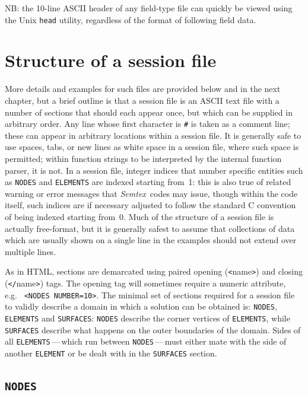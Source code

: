 \documentclass[11pt]{report}
\newcommand{\Semtex}{\emph{Semtex}} \newcommand{\Dog}{\emph{Dog}}
\newcommand{\eg}{e.g.\ } \newcommand{\CC}{\mathrm{c.c.}}
\begin{document}
NB: the 10-line ASCII header of any field-type file can quickly be viewed
using the Unix \verb|head| utility, regardless of the format of
following field data.

\section{Structure of a session file}
\label{sec.session}

More details and examples for such files are provided below and in the
next chapter, but a brief outline is that a session file is an ASCII
text file with a number of sections that should each appear once, but
which can be supplied in arbitrary order.  Any line whose first
character is \verb+#+ is taken as a comment line; these can appear in
arbitrary locations within a session file.  It is generally safe to
use spaces, tabs, or new lines as white space in a session file, where
such space is permitted; within function strings to be interpreted by
the internal function parser, it is not.  In a session file, integer
indices that number specific entities such as \verb|NODES| and
\verb|ELEMENTS| are indexed starting from~1: this is also true of
related warning or error messages that \Semtex\ codes may issue,
though within the code itself, such indices are if necessary adjusted
to follow the standard C convention of being indexed starting from~0.
Much of the structure of a session file is actually free-format, but
it is generally safest to assume that collections of data which are
usually shown on a single line in the examples should not extend over
multiple lines.

As in HTML, sections are demarcated using paired opening
(\verb+<+name\verb+>+) and closing (\verb+</+name\verb+>+) tags.  The
opening tag will sometimes require a numeric attribute, \eg
\verb+<NODES NUMBER=10>+.  The minimal set of sections required for a
session file to validly describe a domain in which a solution can be
obtained is: \verb+NODES+, \verb+ELEMENTS+ and \verb+SURFACES+:
\verb+NODES+ describe the corner vertices of \verb+ELEMENTS+, while
\verb+SURFACES+ describe what happens on the outer boundaries of the
domain. Sides of all \verb+ELEMENTS+\,---\,which run between
\verb+NODES+\,---\,must either mate with the side of another
\verb+ELEMENT+ or be dealt with in the \verb+SURFACES+ section.

\subsection{\texttt{NODES}}
\label{sec.nodes}
\end{document}
